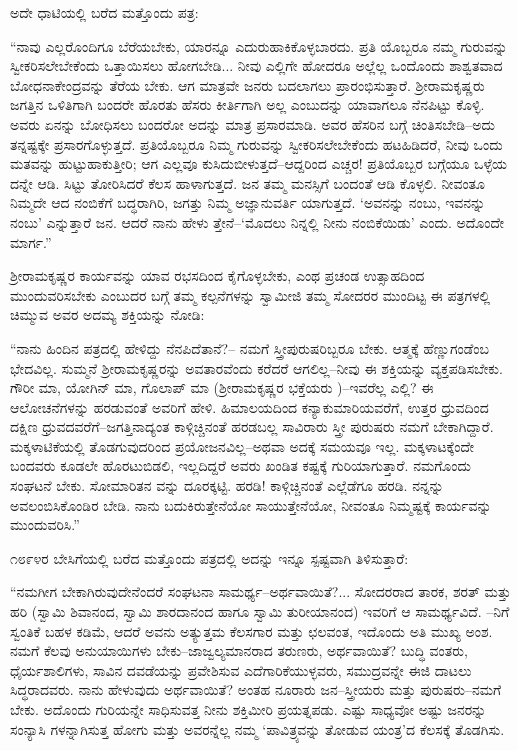ಅದೇ ಧಾಟಿಯಲ್ಲಿ ಬರೆದ ಮತ್ತೊಂದು ಪತ್ರ:

“ನಾವು ಎಲ್ಲರೊಂದಿಗೂ ಬೆರೆಯಬೇಕು, ಯಾರನ್ನೂ ಎದುರುಹಾಕಿಕೊಳ್ಳಬಾರದು. ಪ್ರತಿ ಯೊಬ್ಬರೂ ನಮ್ಮ ಗುರುವನ್ನು ಸ್ವೀಕರಿಸಲೇಬೇಕೆಂದು ಒತ್ತಾಯಿಸಲು ಹೋಗಬೇಡಿ... ನೀವು ಎಲ್ಲಿಗೇ ಹೋದರೂ ಅಲ್ಲೆಲ್ಲ ಒಂದೊಂದು ಶಾಶ್ವತವಾದ ಬೋಧನಾಕೇಂದ್ರವನ್ನು ತೆರೆಯ ಬೇಕು. ಆಗ ಮಾತ್ರವೇ ಜನರು ಬದಲಾಗಲು ಪ್ರಾರಂಭಿಸುತ್ತಾರೆ. ಶ್ರೀರಾಮಕೃಷ್ಣರು ಜಗತ್ತಿನ ಒಳಿತಿಗಾಗಿ ಬಂದರೇ ಹೊರತು ಹೆಸರು ಕೀರ್ತಿಗಾಗಿ ಅಲ್ಲ ಎಂಬುದನ್ನು ಯಾವಾಗಲೂ ನೆನಪಿಟ್ಟು ಕೊಳ್ಳಿ. ಅವರು ಏನನ್ನು ಬೋಧಿಸಲು ಬಂದರೋ ಅದನ್ನು ಮಾತ್ರ ಪ್ರಸಾರಮಾಡಿ. ಅವರ ಹೆಸರಿನ ಬಗ್ಗೆ ಚಿಂತಿಸಬೇಡಿ–ಅದು ತನ್ನಷ್ಟಕ್ಕೇ ಪ್ರಸಾರಗೊಳ್ಳುತ್ತದೆ. ಪ್ರತಿಯೊಬ್ಬರೂ ನಿಮ್ಮ ಗುರುವನ್ನು ಸ್ವೀಕರಿಸಲೇಬೇಕೆಂದು ಹಟಹಿಡಿದರೆ, ನೀವು ಒಂದು ಮತವನ್ನು ಹುಟ್ಟುಹಾಕುತ್ತೀರಿ; ಆಗ ಎಲ್ಲವೂ ಕುಸಿದುಬೀಳುತ್ತದೆ–ಆದ್ದರಿಂದ ಎಚ್ಚರ! ಪ್ರತಿಯೊಬ್ಬರ ಬಗ್ಗೆಯೂ ಒಳ್ಳೆಯ ದನ್ನೇ ಆಡಿ. ಸಿಟ್ಟು ತೋರಿಸಿದರೆ ಕೆಲಸ ಹಾಳಾಗುತ್ತದೆ. ಜನ ತಮ್ಮ ಮನಸ್ಸಿಗೆ ಬಂದಂತೆ ಆಡಿ ಕೊಳ್ಳಲಿ. ನೀವಂತೂ ನಿಮ್ಮದೇ ಆದ ನಂಬಿಕೆಗೆ ಬದ್ಧರಾಗಿರಿ, ಜಗತ್ತು ನಿಮ್ಮ ಅಜ್ಞಾನುವರ್ತಿ ಯಾಗುತ್ತದೆ. ‘ಅವನನ್ನು ನಂಬು, ಇವನನ್ನು ನಂಬು’ ಎನ್ನುತ್ತಾರೆ ಜನ. ಆದರೆ ನಾನು ಹೇಳು ತ್ತೇನೆ–‘ಮೊದಲು ನಿನ್ನಲ್ಲಿ ನೀನು ನಂಬಿಕೆಯಿಡು’ ಎಂದು. ಅದೊಂದೇ ಮಾರ್ಗ.”

ಶ್ರೀರಾಮಕೃಷ್ಣರ ಕಾರ್ಯವನ್ನು ಯಾವ ರಭಸದಿಂದ ಕೈಗೊಳ್ಳಬೇಕು, ಎಂಥ ಪ್ರಚಂಡ ಉತ್ಸಾಹದಿಂದ ಮುಂದುವರಿಸಬೇಕು ಎಂಬುದರ ಬಗ್ಗೆ ತಮ್ಮ ಕಲ್ಪನೆಗಳನ್ನು ಸ್ವಾಮೀಜಿ ತಮ್ಮ ಸೋದರರ ಮುಂದಿಟ್ಟ ಈ ಪತ್ರಗಳಲ್ಲಿ ಚಿಮ್ಮುವ ಅವರ ಅದಮ್ಯ ಶಕ್ತಿಯನ್ನು ನೋಡಿ:

“ನಾನು ಹಿಂದಿನ ಪತ್ರದಲ್ಲಿ ಹೇಳಿದ್ದು ನೆನಪಿದೆತಾನೆ?– ನಮಗೆ ಸ್ತ್ರೀಪುರುಷರಿಬ್ಬರೂ ಬೇಕು. ಆತ್ಮಕ್ಕೆ ಹೆಣ್ಣುಗಂಡೆಂಬ ಭೇದವಿಲ್ಲ. ಸುಮ್ಮನೆ ಶ್ರೀರಾಮಕೃಷ್ಣರನ್ನು ಅವತಾರವೆಂದು ಕರೆದರೆ ಆಗಲಿಲ್ಲ–ನೀವು ಈ ಶಕ್ತಿಯನ್ನು ವ್ಯಕ್ತಪಡಿಸಬೇಕು. ಗೌರೀ ಮಾ, ಯೋಗಿನ್ ಮಾ, ಗೊಲಾಪ್ ಮಾ (ಶ್ರೀರಾಮಕೃಷ್ಣರ ಭಕ್ತೆಯರು )–ಇವರೆಲ್ಲ ಎಲ್ಲಿ? ಈ ಆಲೋಚನೆಗಳನ್ನು ಹರಡುವಂತೆ ಅವರಿಗೆ ಹೇಳಿ. ಹಿಮಾಲಯದಿಂದ ಕನ್ಯಾಕುಮಾರಿಯವರೆಗೆ, ಉತ್ತರ ಧ್ರುವದಿಂದ ದಕ್ಷಿಣ ಧ್ರುವದವರೆಗೆ–ಜಗತ್ತಿನಾದ್ಯಂತ ಕಾಳ್ಗಿಚ್ಚಿನಂತೆ ಹರಡಬಲ್ಲ ಸಾವಿರಾರು ಸ್ತ್ರೀ ಪುರುಷರು ನಮಗೆ ಬೇಕಾಗಿದ್ದಾರೆ. ಮಕ್ಕಳಾಟಿಕೆಯಲ್ಲಿ ತೊಡಗುವುದರಿಂದ ಪ್ರಯೋಜನವಿಲ್ಲ–ಅಥವಾ ಅದಕ್ಕೆ ಸಮಯವೂ ಇಲ್ಲ. ಮಕ್ಕಳಾಟಕ್ಕೆಂದೇ ಬಂದವರು ಕೂಡಲೇ ಹೊರಟುಬಿಡಲಿ, ಇಲ್ಲದಿದ್ದರೆ ಅವರು ಖಂಡಿತ ಕಷ್ಟಕ್ಕೆ ಗುರಿಯಾಗುತ್ತಾರೆ. ನಮಗೊಂದು ಸಂಘಟನೆ ಬೇಕು. ಸೋಮಾರಿತನ ವನ್ನು ದೂರಕ್ಕಟ್ಟಿ. ಹರಡಿ! ಕಾಳ್ಗಿಚ್ಚಿನಂತೆ ಎಲ್ಲೆಡೆಗೂ ಹರಡಿ. ನನ್ನನ್ನು ಅವಲಂಬಿಸಿಕೊಂಡಿರ ಬೇಡಿ. ನಾನು ಬದುಕಿರುತ್ತೇನೆಯೋ ಸಾಯುತ್ತೇನೆಯೋ, ನೀವಂತೂ ನಿಮ್ಮಷ್ಟಕ್ಕೆ ಕಾರ್ಯವನ್ನು ಮುಂದುವರಿಸಿ.”

೧೮೯೪ರ ಬೇಸಿಗೆಯಲ್ಲಿ ಬರೆದ ಮತ್ತೊಂದು ಪತ್ರದಲ್ಲಿ ಅದನ್ನು ಇನ್ನೂ ಸ್ಪಷ್ಟವಾಗಿ ತಿಳಿಸುತ್ತಾರೆ:

“ನಮಗೀಗ ಬೇಕಾಗಿರುವುದೇನೆಂದರೆ ಸಂಘಟನಾ ಸಾಮರ್ಥ್ಯ–ಅರ್ಥವಾಯಿತೆ?... ಸೋದರರಾದ ತಾರಕ, ಶರತ್ ಮತ್ತು ಹರಿ (ಸ್ವಾಮಿ ಶಿವಾನಂದ, ಸ್ವಾಮಿ ಶಾರದಾನಂದ ಹಾಗೂ ಸ್ವಾಮಿ ತುರೀಯಾನಂದ) ಇವರಿಗೆ ಆ ಸಾಮರ್ಥ್ಯವಿದೆ. –ನಿಗೆ ಸ್ವಂತಿಕೆ ಬಹಳ ಕಡಿಮೆ, ಆದರೆ ಅವನು ಅತ್ಯುತ್ತಮ ಕೆಲಸಗಾರ ಮತ್ತು ಛಲವಂತ, ಇದೊಂದು ಅತಿ ಮುಖ್ಯ ಅಂಶ. ನಮಗೆ ಕೆಲವು ಅನುಯಾಯಿಗಳು ಬೇಕು–ಜಾಜ್ವಲ್ಯಮಾನರಾದ ತರುಣರು, ಅರ್ಥವಾಯಿತೆ? ಬುದ್ಧಿ ವಂತರು, ಧೈರ್ಯಶಾಲಿಗಳು, ಸಾವಿನ ದವಡೆಯನ್ನು ಪ್ರವೇಶಿಸುವ ಎದೆಗಾರಿಕೆಯುಳ್ಳವರು, ಸಮುದ್ರವನ್ನೇ ಈಜಿ ದಾಟಲು ಸಿದ್ಧರಾದವರು. ನಾನು ಹೇಳುವುದು ಅರ್ಥವಾಯಿತೆ? ಅಂತಹ ನೂರಾರು ಜನ–ಸ್ತ್ರೀಯರು ಮತ್ತು ಪುರುಷರು–ನಮಗೆ ಬೇಕು. ಅದೊಂದು ಗುರಿಯನ್ನೇ ಸಾಧಿಸುವತ್ತ ನೀನು ಶಕ್ತಿಮೀರಿ ಪ್ರಯತ್ನಪಡು. ಎಷ್ಟು ಸಾಧ್ಯವೋ ಅಷ್ಟು ಜನರನ್ನು ಸಂನ್ಯಾಸಿ ಗಳನ್ನಾಗಿಸುತ್ತ ಹೋಗು ಮತ್ತು ಅವರನ್ನೆಲ್ಲ ನಮ್ಮ ‘ಪಾವಿತ್ರ್ಯವನ್ನು ತೋಡುವ ಯಂತ್ರ’ದ ಕೆಲಸಕ್ಕೆ ತೊಡಗಿಸು. 

